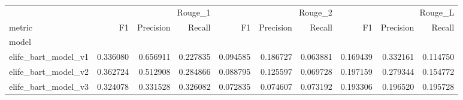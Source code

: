 \begin{tabular}{lrrrrrrrrr}
\toprule
 & \multicolumn{3}{r}{Rouge_1} & \multicolumn{3}{r}{Rouge_2} & \multicolumn{3}{r}{Rouge_L} \\
metric & F1 & Precision & Recall & F1 & Precision & Recall & F1 & Precision & Recall \\
model &  &  &  &  &  &  &  &  &  \\
\midrule
elife_bart_model_v1 & 0.336080 & 0.656911 & 0.227835 & 0.094585 & 0.186727 & 0.063881 & 0.169439 & 0.332161 & 0.114750 \\
elife_bart_model_v2 & 0.362724 & 0.512908 & 0.284866 & 0.088795 & 0.125597 & 0.069728 & 0.197159 & 0.279344 & 0.154772 \\
elife_bart_model_v3 & 0.324078 & 0.331528 & 0.326082 & 0.072835 & 0.074607 & 0.073192 & 0.193306 & 0.196520 & 0.195728 \\
\bottomrule
\end{tabular}
